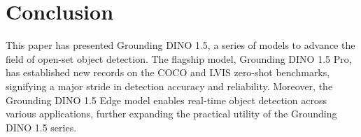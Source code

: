 \section{Conclusion}
This paper has presented Grounding DINO 1.5, a series of models to advance the field of open-set object detection. 
The flagship model, Grounding DINO 1.5 Pro, has established new records on the COCO and LVIS zero-shot benchmarks, signifying a major stride in detection accuracy and reliability. 
Moreover, the Grounding DINO 1.5 Edge model enables real-time object detection across various applications, further expanding the practical utility of the Grounding DINO 1.5 series.